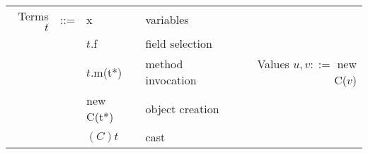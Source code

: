\documentclass[11pt]{article}
\begin{document}
\begin{center}
\begin{tabular}{rcllr}
Terms \(t\) & ::= & x & variables & \\
 &  & \(t\).f & field selection & \\
 &  & \(t\).m(t*) & method invocation & Values \(u,v ::=\) new C(\(v\))\\
 &  & new C(t*) & object creation & \\
 &  & \((C)t\) & cast & \\
\end{tabular}

\end{center}
\end{document}
